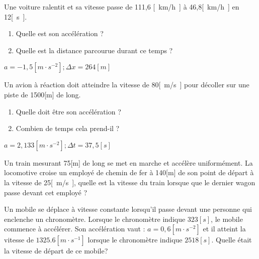 \begin{exercise}
  Une voiture ralentit et sa vitesse passe de 111,6 \unit{[km/h]} à 46,8\unit{[km/h]} en 12\unit{[s]}.
  \begin{enumerate}[label=\alph*)]
    \item Quelle est son accélération ?
    \item Quelle est la distance parcourue durant ce temps ?
  \end{enumerate}
\end{exercise}
\begin{solution}
  \(a=-1,5\unit{[m \cdot s^{-2}]} ; \Delta x=264[m]\)
\end{solution}

\begin{exercise}
\end{exercise}

\begin{exercise}
  Un avion à réaction doit atteindre la vitesse de 80\unit{[m/s]} pour décoller sur une piste de 1500[m] de long.
  \begin{enumerate}[label=\alph*)]
    \item Quelle doit être son accélération ?
    \item Combien de temps cela prend-il ?
  \end{enumerate}
\end{exercise}
\begin{solution}
  \(a=2,133\unit{[m \cdot s^{-2}]} ; \Delta t=37,5\unit{[s]}\)
\end{solution}

\begin{exercise}[difficulty=**]
  Un train mesurant 75[m] de long se met en marche et accélère uniformément. La locomotive croise un employé de chemin de fer à 140[m] de son point de départ à la vitesse de 25\unit{[m/s]}, quelle est la vitesse du train lorsque que le dernier wagon passe devant cet employé ?
\end{exercise}

\begin{exercise}
  Un mobile se déplace à vitesse constante lorsqu'il passe devant une personne qui enclenche un chronomètre. Lorsque le chronomètre indique \(323\unit{[s]}\), le mobile commence à accélérer. Son accélération vaut : \(a=0,6\unit{[m \cdot s^{-2}]}\) et il atteint la vitesse de \(\num{1325,6}\unit{[m \cdot s^{-1}]}\) lorsque le chronomètre indique \(\num{2518}\unit{[s]}\). Quelle était la vitesse de départ de ce mobile?
\end{exercise}

